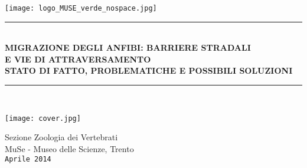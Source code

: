 \documentclass[11pt,a4paper,twoside]{memoir}
\author{\textsl{Sezione Zoologia dei Vertebrati}}
\newcommand{\HRule}{\rule{\linewidth}{0.2mm}}
\begin{document}
\begin{center}
  \texttt{[image: logo\_MUSE\_verde\_nospace.jpg]}
\end{center}

\pagestyle{empty}
 \begin{center}
\vspace{15pt}
\HRule \\[0.3cm]
{\LARGE \bfseries MIGRAZIONE DEGLI ANFIBI: BARRIERE STRADALI } \\[0.1cm]
{\LARGE \bfseries E VIE DI ATTRAVERSAMENTO} \\[0.1cm]
{\large \bfseries STATO DI FATTO, PROBLEMATICHE E POSSIBILI SOLUZIONI}\\[0.1cm]
\HRule\\[0.5cm]
 \end{center}


 \vspace*{\fill}
\begin{center}
 \texttt{[image: cover.jpg]} \\

\end{center}
 \vspace*{\fill}

\vspace*{\fill}
\begin{center}
  Sezione Zoologia dei Vertebrati \\
  MuSe - Museo delle Scienze, Trento \\
  \texttt{Aprile 2014} \\
\end{center}
\end{document}
